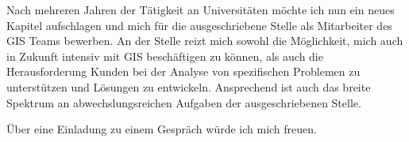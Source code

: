 \documentclass[11pt,a4paper,sans]{moderncv}        %
\begin{document}
Nach mehreren Jahren der T\"atigkeit an Universit\"aten m\"ochte ich nun ein neues Kapitel aufschlagen und mich f\"ur die ausgeschriebene Stelle als Mitarbeiter des GIS Teams bewerben. An der Stelle reizt mich sowohl die M\"oglichkeit, mich auch in Zukunft intensiv mit GIS besch\"aftigen zu k\"onnen, als auch die Herausforderung Kunden bei der Analyse von spezifischen Problemen zu unterst\"utzen und L\"osungen zu entwickeln. Ansprechend ist auch das breite Spektrum an abwechslungsreichen Aufgaben der ausgeschriebenen Stelle. 

\"Uber eine Einladung zu einem Gespr\"ach w\"urde ich mich freuen.

\makeletterclosing
\clearpage
\makecvtitle
\end{document}

